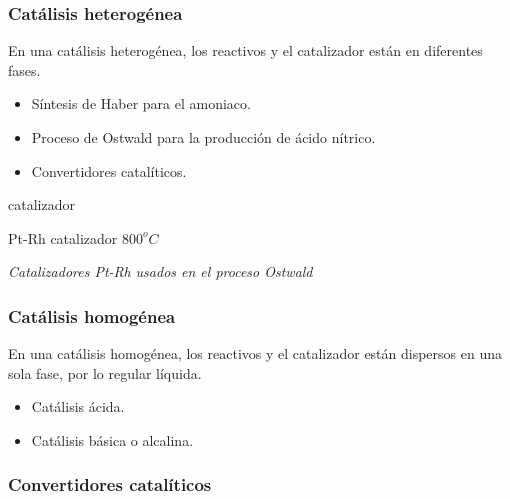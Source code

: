     \subsubsection{Catálisis heterogénea}

     \sangria{} En una catálisis heterogénea, los reactivos y el catalizador están en diferentes fases. \begin{itemize} \item Síntesis de Haber para el amoniaco. \item Proceso de Ostwald para la producción de ácido nítrico. \item Convertidores catalíticos. \end{itemize} 
       \vspace{-20pt} \begin{center} \hspace{20pt}catalizador \end{center}
     \begin{center} Pt-Rh catalizador $800^oC$ \end{center}     \begin{center} \textit{Catalizadores Pt-Rh usados en el proceso Ostwald} \end{center} 
    \subsubsection{Catálisis homogénea}
\sangria{} En una catálisis homogénea, los reactivos y el catalizador están dispersos en una sola fase, por lo regular líquida. \begin{itemize} \item Catálisis ácida. \item Catálisis básica o alcalina. \end{itemize} \saltoPag{}
    \subsubsection{Convertidores catalíticos}


